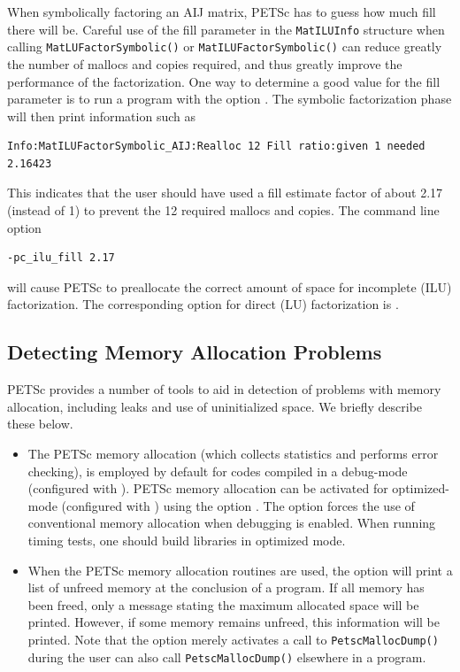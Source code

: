 {{{When symbolically factoring an AIJ matrix, PETSc has to guess
how much fill there will be.  Careful use of the fill parameter in the
\lstinline{MatILUInfo} structure
when calling \lstinline{MatLUFactorSymbolic()} or \lstinline{MatILUFactorSymbolic()}
can reduce greatly the number of mallocs and copies required, and thus
greatly improve the performance of the factorization.  One way to
determine a good value for the fill parameter is to run a program with the option .
The symbolic factorization phase will then print information such as
\begin{lstlisting}
Info:MatILUFactorSymbolic_AIJ:Realloc 12 Fill ratio:given 1 needed 2.16423
\end{lstlisting}
This indicates that the user should have used a fill estimate factor of
about 2.17 (instead of 1) to prevent the 12 required mallocs and copies.
The command line option   
\begin{lstlisting}
-pc_ilu_fill 2.17
\end{lstlisting}
will cause PETSc to preallocate the correct amount of space for incomplete
(ILU) factorization.  The corresponding option for direct (LU) factorization
is .

\subsection{Detecting Memory Allocation Problems}
\label{detecting_memory_problems}

PETSc provides a number of tools to aid in detection of problems
with memory allocation, including leaks and use of uninitialized space.
We briefly describe these below.
 

\begin{itemize}

\item The PETSc memory allocation (which collects statistics and
performs error checking), is employed by default for codes compiled in
a debug-mode (configured with ).  PETSc memory
allocation can be activated for optimized-mode (configured with
) using the option . The option
 forces the use of conventional memory allocation when
debugging is enabled.  When running timing tests, one should build
libraries in optimized mode.

\item When the PETSc memory allocation routines are used, the option
 will print a list of unfreed memory at the conclusion of a
program.  If all memory has been freed, only a message stating
the maximum allocated space will be printed.  However, if some memory
remains unfreed, this information will be printed.  Note that the
option  merely activates a call to \lstinline{PetscMallocDump()} during
 the user can also call \lstinline{PetscMallocDump()} elsewhere
in a program.


\end{itemize}}}}
